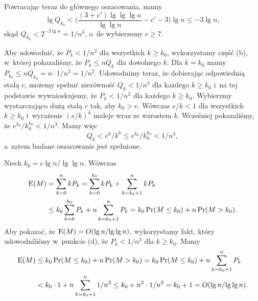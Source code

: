 Powracając teraz do głównego oszacowania, mamy
\[
	\lg Q_{k_0} < \biggl(\frac{(3+c')\lg\lg\lg n}{\lg\lg n}-c'-3\biggr)\lg n \le -3\lg n,
\]
skąd $Q_{k_0}<2^{-3\lg n}=1/n^3$, o~ile wybierzemy $c\ge7$.

Aby udowodnić, że $P_k<1/n^2$ dla wszystkich $k\ge k_0$, wykorzystamy część (b), w~której pokazaliśmy, że $P_k\le nQ_k$ dla dowolnego $k$.
Dla $k=k_0$ mamy $P_{k_0}\le nQ_{k_0}=n\cdot1/n^3=1/n^2$.
Udowodnimy teraz, że dobierając odpowiednią stałą $c$, możemy spełnić nierówność $Q_k<1/n^3$ dla każdego $k\ge k_0$ i~na tej podstawie wywnioskujemy, że $P_k<1/n^2$ dla każdego $k\ge k_0$.
Wybierzmy wystarczająco dużą stałą $c$ tak, aby $k_0>e$.
Wówczas $e/k<1$ dla wszystkich $k\ge k_0$ i~wyrażenie $(e/k)^k$ maleje wraz ze wzrostem $k$.
Wcześniej pokazaliśmy, że $e^{k_0}\!/k_0^{k_0}<1/n^3$.
Mamy więc
\[
	Q_k < e^k\!/k^k \le e^{k_0}\!/k_0^{k_0} < 1/n^3,
\]
a~zatem badane oszacowanie jest spełnione.

\subproblem %
Niech $k_0=c\lg n/\!\lg\lg n$.
Wówczas
\begin{align*}
	\operatorname{E}(M) &= \sum_{k=0}^nkP_k = \sum_{k=0}^{k_0}kP_k+\sum_{k=k_0+1}^nkP_k \\
	&\le k_0\sum_{k=0}^{k_0}P_k+n\sum_{k=k_0+1}^nP_k = k_0\Pr(M\le k_0)+n\Pr(M>k_0).
\end{align*}
Aby pokazać, że $\operatorname{E}(M)=O(\lg n/\!\lg\lg n)$, wykorzystamy fakt, który udowodniliśmy w~punkcie (d), że $P_k<1/n^2$ dla $k\ge k_0$.
Mamy
\begin{align*}
	\operatorname{E}(M) &\le k_0\Pr(M\le k_0)+n\Pr(M>k_0) = k_0\Pr(M\le k_0)+n\sum_{k=k_0+1}^nP_k \\
	&< k_0\cdot1+n\sum_{k=k_0+1}^n1/n^2 \le k_0+n^2\cdot1/n^2 = k_0+1 = O(\lg n/\!\lg\lg n).
\end{align*}
